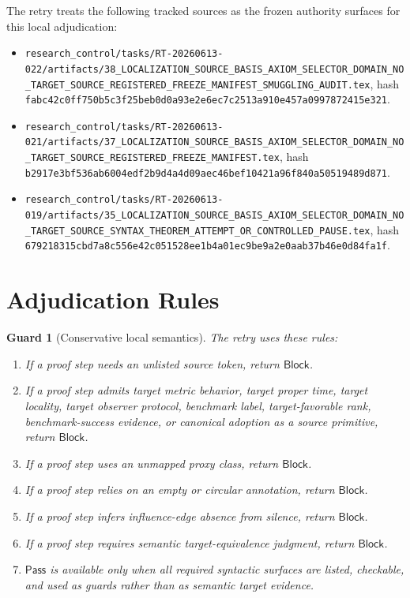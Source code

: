 \documentclass[11pt]{article}
\newcommand{\Pass}{\mathsf{Pass}}
\newcommand{\Block}{\mathsf{Block}}
\newtheorem{guard}{Guard}
\begin{document}
The retry treats the following tracked sources as the frozen authority
surfaces for this local adjudication:
\begin{itemize}
    \item \texttt{research\_control/tasks/RT-20260613-022/artifacts/38\_LOCALIZATION\_SOURCE\_BASIS\_AXIOM\_SELECTOR\_DOMAIN\_NO\_TARGET\_SOURCE\_REGISTERED\_FREEZE\_MANIFEST\_SMUGGLING\_AUDIT.tex},
    hash \texttt{fabc42c0ff750b5c3f25beb0d0a93e2e6ec7c2513a910e457a0997872415e321}.
    \item \texttt{research\_control/tasks/RT-20260613-021/artifacts/37\_LOCALIZATION\_SOURCE\_BASIS\_AXIOM\_SELECTOR\_DOMAIN\_NO\_TARGET\_SOURCE\_REGISTERED\_FREEZE\_MANIFEST.tex},
    hash \texttt{b2917e3bf536ab6004edf2b9d4a4d09aec46bef10421a96f840a50519489d871}.
    \item \texttt{research\_control/tasks/RT-20260613-019/artifacts/35\_LOCALIZATION\_SOURCE\_BASIS\_AXIOM\_SELECTOR\_DOMAIN\_NO\_TARGET\_SOURCE\_SYNTAX\_THEOREM\_ATTEMPT\_OR\_CONTROLLED\_PAUSE.tex},
    hash \texttt{679218315cbd7a8c556e42c051528ee1b4a01ec9be9a2e0aab37b46e0d84fa1f}.
\end{itemize}

\section{Adjudication Rules}

\begin{guard}[Conservative local semantics]
The retry uses these rules:
\begin{enumerate}
    \item If a proof step needs an unlisted source token, return
    \(\Block\).
    \item If a proof step admits target metric behavior, target proper
    time, target locality, target observer protocol, benchmark label,
    target-favorable rank, benchmark-success evidence, or canonical
    adoption as a source primitive, return \(\Block\).
    \item If a proof step uses an unmapped proxy class, return \(\Block\).
    \item If a proof step relies on an empty or circular annotation, return
    \(\Block\).
    \item If a proof step infers influence-edge absence from silence,
    return \(\Block\).
    \item If a proof step requires semantic target-equivalence judgment,
    return \(\Block\).
    \item \(\Pass\) is available only when all required syntactic
    surfaces are listed, checkable, and used as guards rather than as
    semantic target evidence.
\end{enumerate}
\end{guard}
\end{document}
